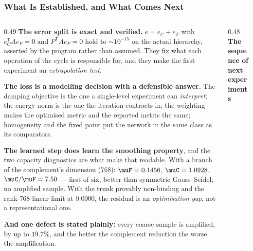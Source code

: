 \frametitle{What Is Established, and What Comes Next}
\footnotesize

\begin{columns}[T]
\begin{column}{0.49\textwidth}
\textbf{The error split is exact and verified.} $e=e_C+e_F$ with $e_C^{\mathsf T}Ae_F=0$ and
$P^{\mathsf T}Ae_F=0$ hold to $\sim10^{-15}$ on the actual hierarchy, asserted by the
program rather than assumed. They fix what each operation of the cycle is responsible for,
and they make the first experiment an \emph{extrapolation test}.

\textbf{The loss is a modelling decision with a defensible answer.} The damping objective
is the one a single-level experiment can \emph{interpret}; the energy norm is the one the
iteration contracts in; the weighting makes the optimised metric and the reported metric the
same; homogeneity and the fixed point put the network in the same class as its comparators.

\textbf{The learned step does learn the smoothing property}, and the two capacity
diagnostics are what make that readable. With a branch of the complement's dimension
($768$): $\muF=0.1456$, $\muC=1.0928$, $\muC/\muF=7.50$ --- first of six, better than
symmetric Gauss--Seidel, no amplified sample. With the trunk provably non-binding and the
rank-$768$ linear limit at $0.0000$, the residual is an \emph{optimisation gap}, not a
representational one.

\textbf{And one defect is stated plainly:} every coarse sample is amplified, by up to
$19.7\%$, and the better the complement reduction the worse the amplification.
\end{column}
\begin{column}{0.48\textwidth}
\centering
\textbf{The sequence of next experiments}
\vspace{1mm}


\end{column}
\end{columns}
